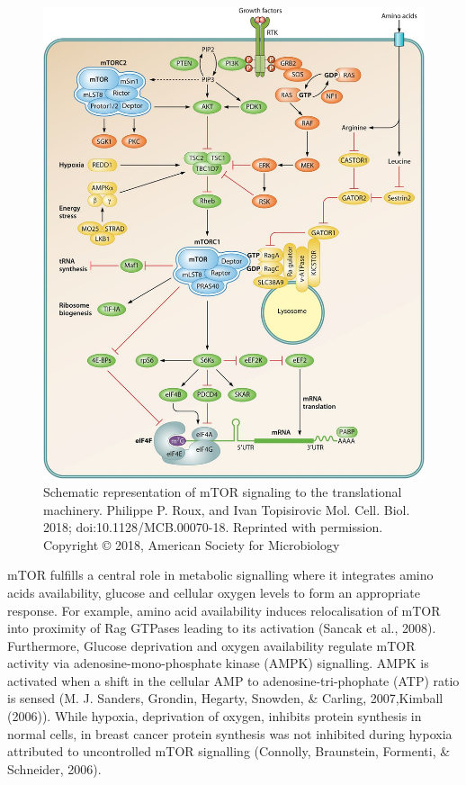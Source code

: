 \documentclass[12pt,openany]{book}
\begin{document}
\begin{figure}
  \includegraphics{./figures/mTORsignal.jpg}
  \caption{Schematic representation of mTOR signaling to the translational machinery. Philippe P. Roux, and Ivan Topisirovic Mol. Cell. Biol. 2018; doi:10.1128/MCB.00070-18. Reprinted with permission. Copyright © 2018, American Society for Microbiology
 \label{fig:mtorsignal}}
\end{figure}

mTOR fulfills a central role in metabolic signalling where it integrates
amino acids availability, glucose and cellular oxygen levels to form an
appropriate response. For example, amino acid availability induces
relocalisation of mTOR into proximity of Rag GTPases leading to its
activation (Sancak et al., 2008). Furthermore, Glucose deprivation and
oxygen availability regulate mTOR activity via adenosine-mono-phosphate
kinase (AMPK) signalling. AMPK is activated when a shift in the cellular
AMP to adenosine-tri-phophate (ATP) ratio is sensed (M. J. Sanders,
Grondin, Hegarty, Snowden, \& Carling, 2007,Kimball (2006)). While
hypoxia, deprivation of oxygen, inhibits protein synthesis in normal
cells, in breast cancer protein synthesis was not inhibited during
hypoxia attributed to uncontrolled mTOR signalling (Connolly,
Braunstein, Formenti, \& Schneider, 2006).
\end{document}
